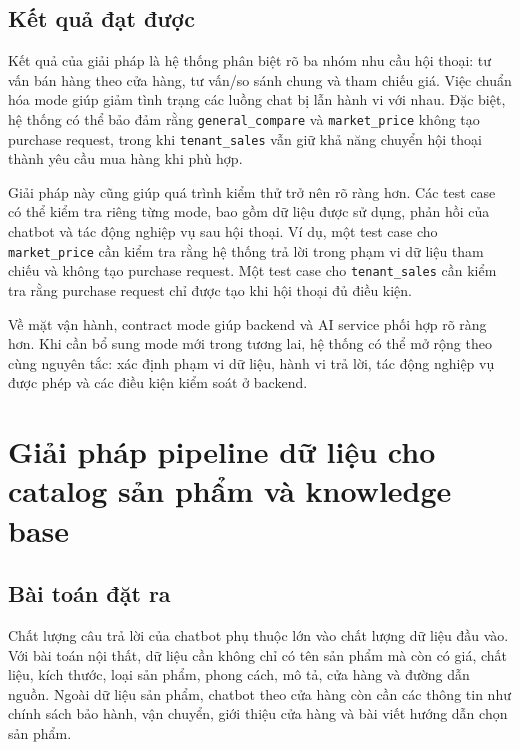 \documentclass[../DoAn.tex]{subfiles}
\begin{document}
\subsection{Kết quả đạt được}
\label{subsection:5.3.3}

Kết quả của giải pháp là hệ thống phân biệt rõ ba nhóm nhu cầu hội thoại: tư vấn bán hàng theo cửa hàng, tư vấn/so sánh chung và tham chiếu giá. Việc chuẩn hóa mode giúp giảm tình trạng các luồng chat bị lẫn hành vi với nhau. Đặc biệt, hệ thống có thể bảo đảm rằng \texttt{general\_compare} và \texttt{market\_price} không tạo purchase request, trong khi \texttt{tenant\_sales} vẫn giữ khả năng chuyển hội thoại thành yêu cầu mua hàng khi phù hợp.

Giải pháp này cũng giúp quá trình kiểm thử trở nên rõ ràng hơn. Các test case có thể kiểm tra riêng từng mode, bao gồm dữ liệu được sử dụng, phản hồi của chatbot và tác động nghiệp vụ sau hội thoại. Ví dụ, một test case cho \texttt{market\_price} cần kiểm tra rằng hệ thống trả lời trong phạm vi dữ liệu tham chiếu và không tạo purchase request. Một test case cho \texttt{tenant\_sales} cần kiểm tra rằng purchase request chỉ được tạo khi hội thoại đủ điều kiện.

Về mặt vận hành, contract mode giúp backend và AI service phối hợp rõ ràng hơn. Khi cần bổ sung mode mới trong tương lai, hệ thống có thể mở rộng theo cùng nguyên tắc: xác định phạm vi dữ liệu, hành vi trả lời, tác động nghiệp vụ được phép và các điều kiện kiểm soát ở backend.


\section{Giải pháp pipeline dữ liệu cho catalog sản phẩm và knowledge base}
\label{section:5.4}

\subsection{Bài toán đặt ra}
\label{subsection:5.4.1}

Chất lượng câu trả lời của chatbot phụ thuộc lớn vào chất lượng dữ liệu đầu vào. Với bài toán nội thất, dữ liệu cần không chỉ có tên sản phẩm mà còn có giá, chất liệu, kích thước, loại sản phẩm, phong cách, mô tả, cửa hàng và đường dẫn nguồn. Ngoài dữ liệu sản phẩm, chatbot theo cửa hàng còn cần các thông tin như chính sách bảo hành, vận chuyển, giới thiệu cửa hàng và bài viết hướng dẫn chọn sản phẩm.
\end{document}
